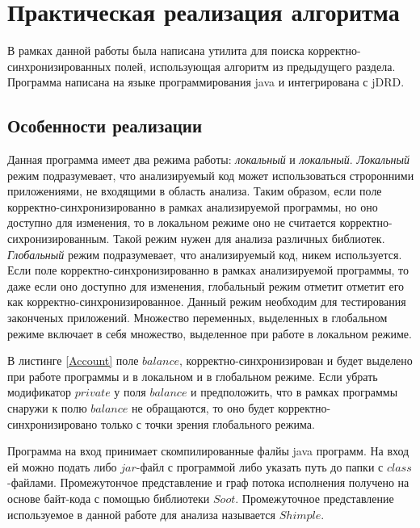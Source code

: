 \chapter{Практическая реализация алгоритма}

В рамках данной работы была написана утилита для поиска корректно-синхронизированных полей, использующая алгоритм из предыдущего раздела. Программа написана на языке программирования java и интегрирована с jDRD.

\FloatBarrier
\section{Особенности реализации}
Данная программа имеет два режима работы: \emph{локальный} и \emph{локальный}. \emph{Локальный} режим подразумевает, что анализируемый код
может использоваться строронними приложениями, не входящими в область анализа. Таким образом, если поле корректно-синхронизированно в рамках анализируемой программы, но оно доступно для изменения, то в локальном режиме оно не считается корректно-сихронизированным. Такой режим нужен для анализа различных библиотек. \emph{Глобальный} режим подразумевает, что 
анализируемый код, никем используется. Если поле корректно-синхронизированно в рамках анализируемой программы, то даже если оно доступно для изменения, глобальный режим отметит отметит его как корректно-синхронизированное. Данный режим необходим для тестирования законченых приложений. Множество переменных, выделенных в глобальном режиме включает в себя множество, выделенное при работе в локальном режиме.



В листинге \ref{Account} поле $balance$, корректно-синхронизирован и будет выделено при работе программы и в локальном и в глобальном режиме. Если убрать модификатор $private$ у поля $balance$ и предположить, что в рамках программы снаружи к полю
$balance$ не обращаются, то оно будет корректно-синхронизировано только с точки зрения глобального режима.



Программа на вход принимает скомпилированные фалйы java программ. На вход ей можно подать либо $jar$-файл с программой либо указать путь до папки с $class$-файлами.  Промежутончое представление и граф потока исполнения получено на основе байт-кода с помощью библиотеки $Soot$\cite{SootPage}. Промежуточное представление используемое в данной работе для анализа называется $Shimple$\cite{Soot}.


